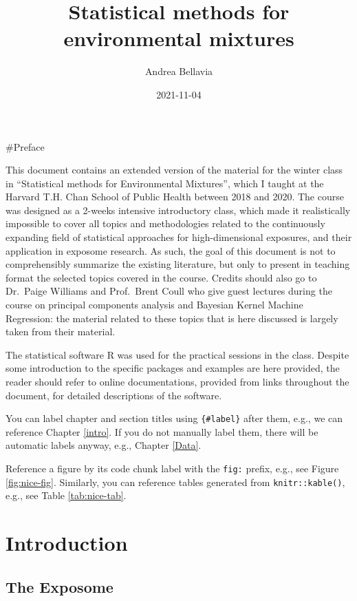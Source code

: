 \documentclass[
]{book}
\title{Statistical methods for environmental mixtures}
\author{Andrea Bellavia}
\date{2021-11-04}
\begin{document}
\maketitle

{
\setcounter{tocdepth}{1}
\tableofcontents
}
\#Preface

This document contains an extended version of the material for the winter class in ``Statistical methods for Environmental Mixtures'', which I taught at the Harvard T.H. Chan School of Public Health between 2018 and 2020. The course was designed as a 2-weeks intensive introductory class, which made it realistically impossible to cover all topics and methodologies related to the continuously expanding field of statistical approaches for high-dimensional exposures, and their application in exposome research. As such, the goal of this document is not to comprehensibly summarize the existing literature, but only to present in teaching format the selected topics covered in the course. Credits should also go to Dr.~Paige Williams and Prof.~Brent Coull who give guest lectures during the course on principal components analysis and Bayesian Kernel Machine Regression: the material related to these topics that is here discussed is largely taken from their material.

The statistical software R was used for the practical sessions in the class. Despite some introduction to the specific packages and examples are here provided, the reader should refer to online documentations, provided from links throughout the document, for detailed descriptions of the software.

You can label chapter and section titles using \texttt{\{\#label\}} after them, e.g., we can reference Chapter \ref{intro}. If you do not manually label them, there will be automatic labels anyway, e.g., Chapter \ref{Data}.

Reference a figure by its code chunk label with the \texttt{fig:} prefix, e.g., see Figure \ref{fig:nice-fig}. Similarly, you can reference tables generated from \texttt{knitr::kable()}, e.g., see Table \ref{tab:nice-tab}.

\hypertarget{introduction}{%
\chapter{Introduction}\label{introduction}}

\hypertarget{the-exposome}{%
\section{The Exposome}\label{the-exposome}}
\end{document}

